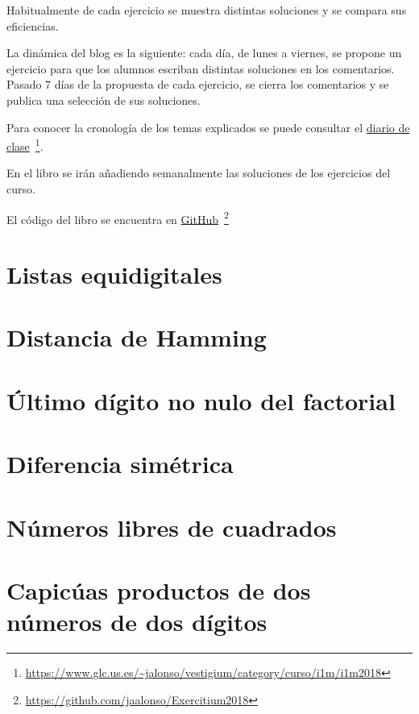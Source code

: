 \documentclass[a4paper,12pt,twoside]{book}
\begin{document}
Habitualmente de cada ejercicio se muestra distintas soluciones y se
compara sus eficiencias.

La dinámica del blog es la siguiente: cada día, de lunes a viernes, se
propone un ejercicio para que los alumnos escriban distintas soluciones
en los comentarios. Pasado 7 días de la propuesta de cada ejercicio, se
cierra los comentarios y se publica una selección de sus soluciones.

Para conocer la cronología de los temas explicados se puede consultar el
\href{https://www.glc.us.es/~jalonso/vestigium/category/curso/i1m/i1m2018}
     {diario de clase}\
     \footnote{\url{https://www.glc.us.es/~jalonso/vestigium/category/curso/i1m/i1m2018}}.

En el libro se irán añadiendo semanalmente las soluciones de los
ejercicios del curso.

El código del libro se encuentra en
\href{https://github.com/jaalonso/Exercitium2018}
     {GitHub}\
     \footnote{\url{https://github.com/jaalonso/Exercitium2018}}

\chapter{Listas equidigitales}

\chapter{Distancia de Hamming}

\chapter{Último dígito no nulo del factorial}

\chapter{Diferencia simétrica}

\chapter{Números libres de cuadrados}

\chapter{Capicúas productos de dos números de dos dígitos}
\end{document}

